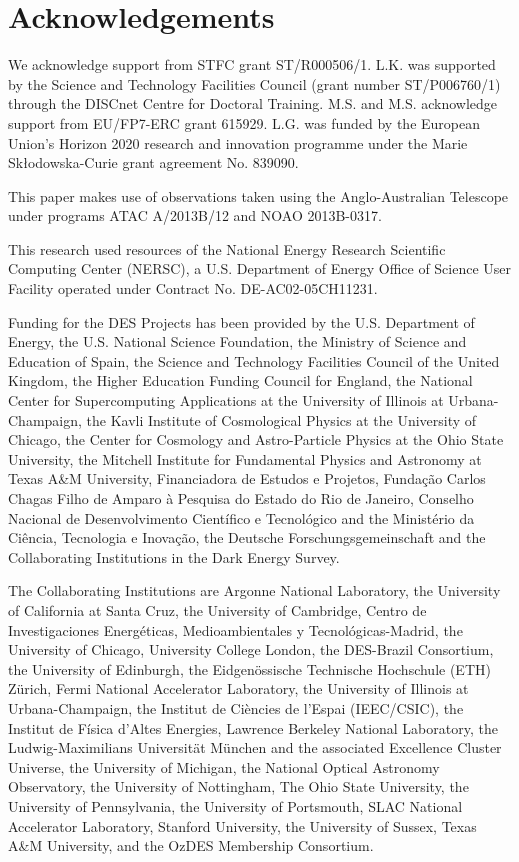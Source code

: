 \documentclass[fleqn,usenatbib,]{mnras}
\begin{document}
\section*{Acknowledgements}

We acknowledge support from STFC grant ST/R000506/1. L.K. was supported by the Science and Technology Facilities Council (grant number ST/P006760/1) through the DISCnet Centre for Doctoral Training. M.S. and M.S. acknowledge support from EU/FP7-ERC grant 615929. L.G. was funded by the European Union's Horizon 2020 research and innovation programme under the Marie Sk\l{}odowska-Curie grant agreement No. 839090.

This paper makes use of observations taken using the Anglo-Australian Telescope under programs ATAC A/2013B/12 and NOAO 2013B-0317.

This research used resources of the National Energy Research Scientific Computing Center (NERSC), a U.S. Department of Energy Office of Science User Facility operated under Contract No. DE-AC02-05CH11231.

Funding for the DES Projects has been provided by the U.S. Department of Energy, the U.S. National Science Foundation, the Ministry of Science and Education of Spain, 
the Science and Technology Facilities Council of the United Kingdom, the Higher Education Funding Council for England, the National Center for Supercomputing 
Applications at the University of Illinois at Urbana-Champaign, the Kavli Institute of Cosmological Physics at the University of Chicago, 
the Center for Cosmology and Astro-Particle Physics at the Ohio State University,
the Mitchell Institute for Fundamental Physics and Astronomy at Texas A\&M University, Financiadora de Estudos e Projetos, 
Funda{\c c}{\~a}o Carlos Chagas Filho de Amparo {\`a} Pesquisa do Estado do Rio de Janeiro, Conselho Nacional de Desenvolvimento Cient{\'i}fico e Tecnol{\'o}gico and 
the Minist{\'e}rio da Ci{\^e}ncia, Tecnologia e Inova{\c c}{\~a}o, the Deutsche Forschungsgemeinschaft and the Collaborating Institutions in the Dark Energy Survey. 

The Collaborating Institutions are Argonne National Laboratory, the University of California at Santa Cruz, the University of Cambridge, Centro de Investigaciones Energ{\'e}ticas, 
Medioambientales y Tecnol{\'o}gicas-Madrid, the University of Chicago, University College London, the DES-Brazil Consortium, the University of Edinburgh, 
the Eidgen{\"o}ssische Technische Hochschule (ETH) Z{\"u}rich, 
Fermi National Accelerator Laboratory, the University of Illinois at Urbana-Champaign, the Institut de Ci{\`e}ncies de l'Espai (IEEC/CSIC), 
the Institut de F{\'i}sica d'Altes Energies, Lawrence Berkeley National Laboratory, the Ludwig-Maximilians Universit{\"a}t M{\"u}nchen and the associated Excellence Cluster Universe, 
the University of Michigan, the National Optical Astronomy Observatory, the University of Nottingham, The Ohio State University, the University of Pennsylvania, the University of Portsmouth, 
SLAC National Accelerator Laboratory, Stanford University, the University of Sussex, Texas A\&M University, and the OzDES Membership Consortium.
\end{document}
